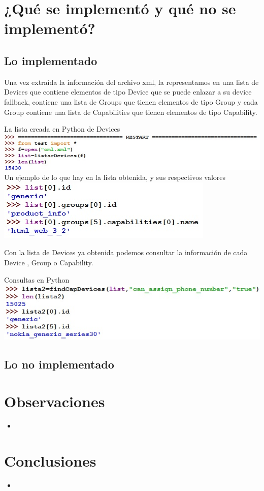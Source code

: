 \documentclass[11pt]{article} %
\begin{document}
\section{¿Qué se implementó y qué no se implementó? }
\subsection{Lo implementado} 
Una vez extraída la información del archivo xml, la representamos en una lista de Devices que contiene elementos de tipo Device que se puede enlazar a su device fallback, contiene una lista de Groups que tienen elementos de tipo Group y cada Group contiene una lista  de  Capabilities que tienen elementos de tipo Capability.
\begin{center}
La lista creada en Python de Devices
\includegraphics[scale=0.80]{Imagenes/3.jpg}
\\Un ejemplo de lo que hay en la lista obtenida, y sus respectivos valores
\includegraphics[scale=0.80]{Imagenes/4.jpg}
\end{center}
Con la lista de Devices ya obtenida podemos consultar la información de cada Device , Group o Capability. 
\begin{center}
Consultas en Python\\
\includegraphics[scale=0.80]{Imagenes/5.jpg}
\end{center}
\subsection{Lo no implementado} 

\section{Observaciones}
\begin{itemize}
\item  
\end{itemize}

\section{ Conclusiones}
\begin{itemize}
\item  
\end {itemize}
\end{document}
